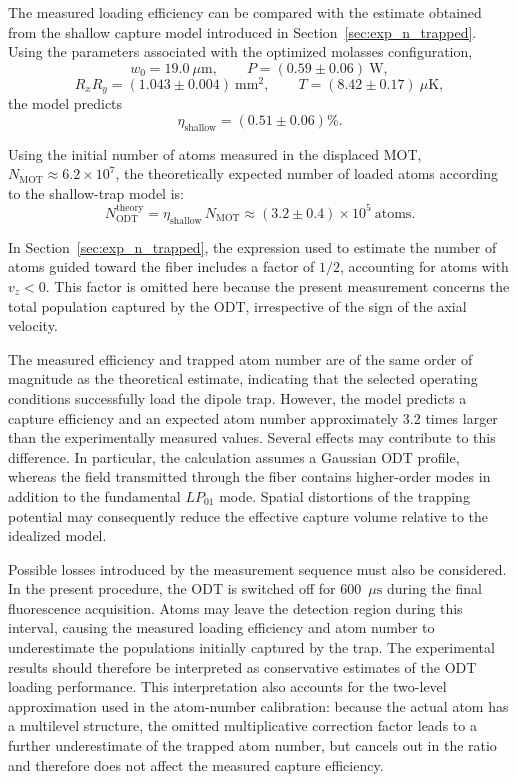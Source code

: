 The measured loading efficiency can be compared with the estimate obtained from the shallow capture model introduced in Section~\ref{sec:exp_n_trapped}. Using the parameters associated with the optimized molasses configuration,
\begin{equation}
    w_0=19.0~\mu\mathrm{m},
    \qquad
    P=(0.59\pm0.06)~\mathrm{W},
\end{equation}
\begin{equation}
    R_xR_y=(1.043\pm0.004)~\mathrm{mm}^2,
    \qquad
    T=(8.42\pm0.17)~\mu\mathrm{K},
\end{equation}
the model predicts
\begin{equation}
    \eta_{\mathrm{shallow}} = (0.51\pm0.06)\%.
\end{equation}

Using the initial number of atoms measured in the displaced MOT, $N_{\mathrm{MOT}} \approx 6.2 \times 10^7$, the theoretically expected number of loaded atoms according to the shallow-trap model is:
\begin{equation}
    N_{\mathrm{ODT}}^{\mathrm{theory}} = \eta_{\mathrm{shallow}} \, N_{\mathrm{MOT}} \approx (3.2 \pm 0.4) \times 10^5~\text{atoms}.
\end{equation}

In Section~\ref{sec:exp_n_trapped}, the expression used to estimate the number of atoms guided toward the fiber includes a factor of $1/2$, accounting for atoms with $v_z<0$. This factor is omitted here because the present measurement concerns the total population captured by the ODT, irrespective of the sign of the axial velocity.

The measured efficiency and trapped atom number are of the same order of magnitude as the theoretical estimate, indicating that the selected operating conditions successfully load the dipole trap. However, the model predicts a capture efficiency and an expected atom number approximately 3.2 times larger than the experimentally measured values. Several effects may contribute to this difference. In particular, the calculation assumes a Gaussian ODT profile, whereas the field transmitted through the fiber contains higher-order modes in addition to the fundamental $LP_{01}$ mode. Spatial distortions of the trapping potential may consequently reduce the effective capture volume relative to the idealized model.

Possible losses introduced by the measurement sequence must also be considered. In the present procedure, the ODT is switched off for 600~$\mu\mathrm{s}$ during the final fluorescence acquisition. Atoms may leave the detection region during this interval, causing the measured loading efficiency and atom number to underestimate the populations initially captured by the trap. The experimental results should therefore be interpreted as conservative estimates of the ODT loading performance. This interpretation also accounts for the two-level approximation used in the atom-number calibration: because the actual atom has a multilevel structure, the omitted multiplicative correction factor leads to a further underestimate of the trapped atom number, but cancels out in the ratio and therefore does not affect the measured capture efficiency.